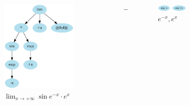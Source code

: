 \documentclass[aspectratio=149]{beamer}
\begin{document}
	\begin{frame}
		\begin{columns}
			\begin{column}{0.45\textwidth}
				\begin{figure}
					\includegraphics[width=0.8\textwidth]{pres_img/simplified2.png}
					\caption{\(\lim_{x \to +\infty}{\sin{e^{-x}} \cdot e^{x}}\)}
				\end{figure}
			\end{column}
			\begin{column}{0.1\textwidth}
				\begin{center}
					$\rightarrow$
				\end{center}
			\end{column}
			\begin{column}{0.45\textwidth}
				\begin{figure}
					\includegraphics[width=0.5\textwidth]{pres_img/mrv_2.png}
					\caption{\(e^{-x}, e^{x}\)}
				\end{figure}
			\end{column}
		\end{columns}
	\end{frame}
	
\end{document}
